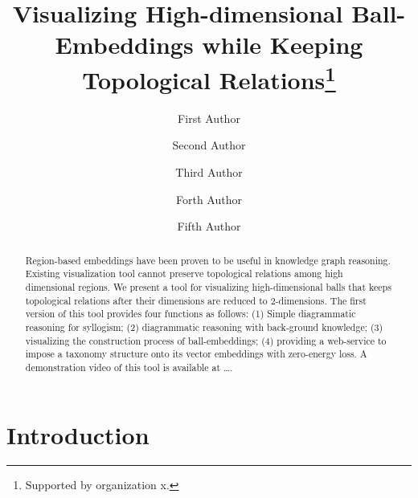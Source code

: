 \documentclass[runningheads]{llncs}
\begin{document}
%
\title{Visualizing High-dimensional Ball-Embeddings while Keeping Topological Relations\thanks{Supported by organization x.}}
%
%
\author{First Author \and
Second Author  \and
Third Author  \and
Forth Author  \and
Fifth Author}
%
%
%
\maketitle              %

\begin{abstract}
Region-based embeddings have been proven to be useful in knowledge graph reasoning. Existing visualization tool cannot preserve topological relations among high dimensional regions. We present a tool for visualizing high-dimensional balls that keeps topological relations after their dimensions are reduced to 2-dimensions. The first version of this tool provides four functions as follows: (1) Simple diagrammatic reasoning for syllogism; (2) diagrammatic reasoning with back-ground knowledge; (3) visualizing the construction process of ball-embeddings; (4) providing a web-service to impose a taxonomy structure onto its vector embeddings with zero-energy loss. A demonstration video of this tool is available at \dots. 
 
\end{abstract}
%
%
%
\section{Introduction}
\end{document}
